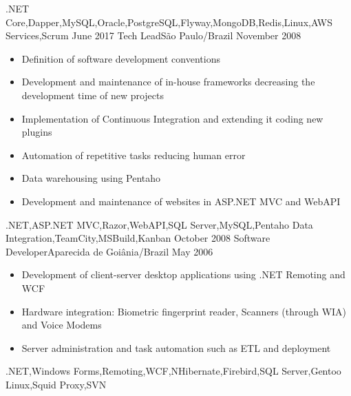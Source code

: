 \begin{experiences}
{                }
                {.NET Core,Dapper,MySQL,Oracle,PostgreSQL,Flyway,MongoDB,Redis,Linux,AWS Services,Scrum}
  \emptySeparator
  \experience
    {June 2017}     {Tech Lead}{}{São Paulo/Brazil}
    {November 2008} {
                      \begin{itemize}
                        \item Definition of software development conventions
                        \item Development and maintenance of in-house frameworks decreasing the development time of new projects
                        \item Implementation of Continuous Integration and extending it coding new plugins
                        \item Automation of repetitive tasks reducing human error
                        \item Data warehousing using Pentaho
                        \item Development and maintenance of websites in ASP.NET MVC and WebAPI
                      \end{itemize}
                    }
                    {.NET,ASP.NET MVC,Razor,WebAPI,SQL Server,MySQL,Pentaho Data Integration,TeamCity,MSBuild,Kanban}
  \emptySeparator
  \experience
  {October 2008} {Software Developer}{}{Aparecida de Goiânia/Brazil}
  {May 2006}     {
                   \begin{itemize}
                     \item Development of client-server desktop applications using .NET Remoting and WCF
                     \item Hardware integration: Biometric fingerprint reader, Scanners (through WIA) and Voice Modems
                     \item Server administration and task automation such as ETL and deployment
                   \end{itemize}
                 }
                 {.NET,Windows Forms,Remoting,WCF,NHibernate,Firebird,SQL Server,Gentoo Linux,Squid Proxy,SVN}
\end{experiences}